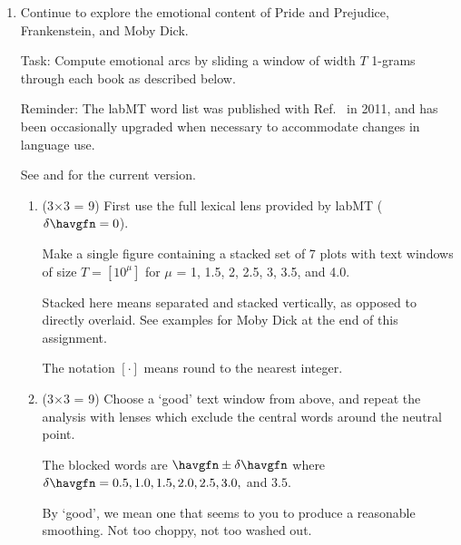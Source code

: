 \begin{enumerate}

\item

  Continue to explore the emotional content of Pride and Prejudice, Frankenstein, and Moby Dick.

  Task: Compute emotional arcs by sliding a window of width $T$ 1-grams through each book
  as described below.

  
  Reminder: The labMT word list was published with Ref.~\cite{dodds2011e} in 2011, and
  has been occasionally upgraded when necessary to accommodate changes in language use.
  
  See 
  and
  for the current version.


  \begin{enumerate}
  \item (3$\times$3 = 9)
    First use the full lexical lens provided by labMT ($\delta \havgfn = 0$).


    Make a single figure containing a stacked set of 7 plots with text windows of size $T = [10^{\mu}]$
    for $\mu$ = 1, 1.5, 2, 2.5, 3, 3.5, and 4.0.

    Stacked here means separated and stacked vertically, as opposed to directly overlaid.
    See examples for Moby Dick at the end of this assignment.

    The notation $[ \cdot ]$ means round to the nearest integer.
  \item (3$\times$3 = 9)
    Choose a `good' text window from above, and repeat the analysis with lenses
    which exclude the central words around the neutral point.
    
    The blocked words are $\havgfn \pm \delta \havgfn$
    where $\delta \havgfn = 0.5, 1.0, 1.5, 2.0, 2.5, 3.0,$ and $3.5$.

    By `good', we mean one that seems to you to produce a reasonable smoothing.
    Not too choppy, not too washed out.
    
  \end{enumerate}


\end{enumerate}
